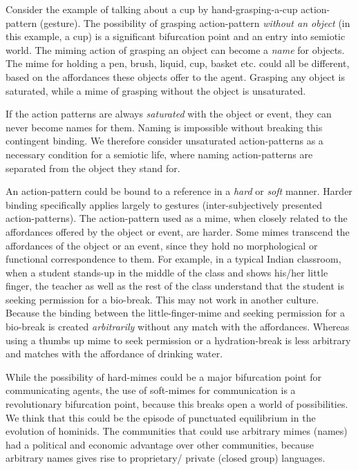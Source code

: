 Consider the example of talking about a cup by hand-grasping-a-cup action-pattern (gesture). The possibility of grasping action-pattern \textit{without an object} (in this example, a cup) is a significant bifurcation point and an entry into semiotic world. The miming action of grasping an object can become a \textit{name} for objects. The mime for holding a pen, brush, liquid, cup, basket etc. could all be different, based on the affordances these objects offer to the agent. Grasping any object is saturated, while a mime of grasping without the object is unsaturated.

If the action patterns are always \textit{saturated} with the object or event, they can never become names for them. Naming is impossible without breaking this contingent binding. We therefore consider unsaturated action-patterns as a necessary condition for a semiotic life, where naming action-patterns are separated from the object they stand for.

An action-pattern could be bound to a reference in a \textit{hard} or \textit{soft} manner. Harder binding specifically applies largely to gestures (inter-subjectively presented action-patterns). The action-pattern used as a mime, when closely related to the affordances offered by the object or event, are harder. Some mimes transcend the affordances of the object or an event, since they hold no morphological or functional correspondence to them. For example, in a typical Indian classroom, when a student stands-up in the middle of the class and shows his/her little finger, the teacher as well as the rest of the class understand that the student is seeking permission for a bio-break. This may not work in another culture. Because the binding between the little-finger-mime and seeking permission for a bio-break is created \textit{arbitrarily} without any match with the affordances. Whereas using a thumbs up mime to seek permission or a hydration-break is less arbitrary and matches with the affordance of drinking water.

While the possibility of hard-mimes could be a major bifurcation point for communicating agents, the use of soft-mimes for communication is a revolutionary bifurcation point, because this breaks open a world of possibilities. We think that this could be the episode of punctuated equilibrium\cite{gould1977punctuated} in the evolution of hominids. The communities that could use arbitrary mimes (names) had a political and economic advantage over other communities, because arbitrary names gives rise to proprietary/ private (closed group) languages.\cite{corballis2014recursive}

